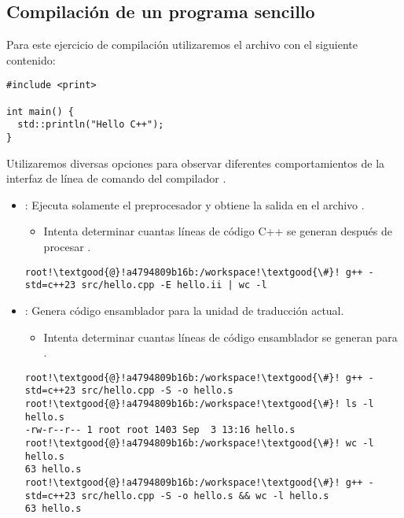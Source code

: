 \subsection{Compilación de un programa sencillo}

Para este ejercicio de compilación utilizaremos el archivo  
con el siguiente contenido:

\begin{lstlisting}
#include <print>

int main() {
  std::println("Hello C++");
}
\end{lstlisting}

Utilizaremos diversas opciones para observar diferentes comportamientos de la
interfaz de línea de comando del compilador
.

\begin{itemize}
  \item {}: 
        Ejecuta solamente el preprocesador y obtiene la salida en el archivo 
        .
    \begin{itemize}
      \item Intenta determinar cuantas líneas de código C++ se generan después 
            de procesar .
    \end{itemize}
\begin{lstlisting}[style=terminal,escapechar=!]
root!\textgood{@}!a4794809b16b:/workspace!\textgood{\#}! g++ -std=c++23 src/hello.cpp -E hello.ii | wc -l
\end{lstlisting}


  \item {}:
        Genera código ensamblador para la unidad de traducción actual.
    \begin{itemize}
      \item Intenta determinar cuantas líneas de código ensamblador se generan 
            para .
    \end{itemize}
\begin{lstlisting}[style=terminal,escapechar=!]
root!\textgood{@}!a4794809b16b:/workspace!\textgood{\#}! g++ -std=c++23 src/hello.cpp -S -o hello.s
root!\textgood{@}!a4794809b16b:/workspace!\textgood{\#}! ls -l hello.s
-rw-r--r-- 1 root root 1403 Sep  3 13:16 hello.s
root!\textgood{@}!a4794809b16b:/workspace!\textgood{\#}! wc -l hello.s 
63 hello.s
root!\textgood{@}!a4794809b16b:/workspace!\textgood{\#}! g++ -std=c++23 src/hello.cpp -S -o hello.s && wc -l hello.s 
63 hello.s
\end{lstlisting}


\end{itemize}
